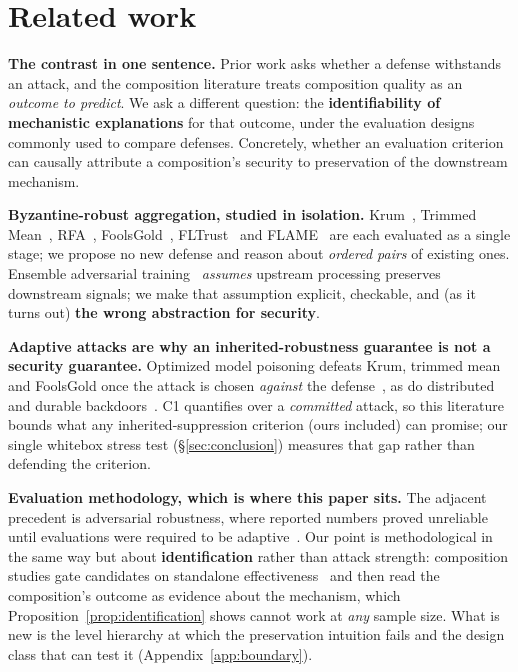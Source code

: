 \documentclass{article}
\begin{document}
\section{Related work}
\label{app:related}

\noindent\textbf{The contrast in one sentence.} Prior work asks whether a defense withstands an attack, and the composition literature treats composition quality as an \emph{outcome to predict}. We ask a different question: the \textbf{identifiability of mechanistic explanations} for that outcome, under the evaluation designs commonly used to compare defenses. Concretely, whether an evaluation criterion can causally attribute a composition's security to preservation of the downstream mechanism.

\noindent\textbf{Byzantine-robust aggregation, studied in isolation.} Krum~\citep{blanchard2017machine}, Trimmed Mean~\citep{yin2018byzantine}, RFA~\citep{pillutla2022robust}, FoolsGold~\citep{fung2020foolsgold}, FLTrust~\citep{cao2021fltrust} and FLAME~\citep{nguyen2022flame} are each evaluated as a single stage; we propose no new defense and reason about \emph{ordered pairs} of existing ones. Ensemble adversarial training~\citep{tramer2018ensemble} \emph{assumes} upstream processing preserves downstream signals; we make that assumption explicit, checkable, and (as it turns out) \textbf{the wrong abstraction for security}.

\noindent\textbf{Adaptive attacks are why an inherited-robustness guarantee is not a security guarantee.} Optimized model poisoning defeats Krum, trimmed mean and FoolsGold once the attack is chosen \emph{against} the defense~\citep{shejwalkar2021manipulating,bhagoji2019analyzing}, as do distributed and durable backdoors~\citep{xie2019dba,wang2020attack,zhang2022neurotoxin}. C1 quantifies over a \emph{committed} attack, so this literature bounds what any inherited-suppression criterion (ours included) can promise; our single whitebox stress test (\S\ref{sec:conclusion}) measures that gap rather than defending the criterion.

\noindent\textbf{Evaluation methodology, which is where this paper sits.} The adjacent precedent is adversarial robustness, where reported numbers proved unreliable until evaluations were required to be adaptive~\citep{croce2020robustbench}. Our point is methodological in the same way but about \textbf{identification} rather than attack strength: composition studies gate candidates on standalone effectiveness~\citep{kairouz2021advances} and then read the composition's outcome as evidence about the mechanism, which Proposition~\ref{prop:identification} shows cannot work at \emph{any} sample size. What is new is the level hierarchy at which the preservation intuition fails and the design class that can test it (Appendix~\ref{app:boundary}).
\end{document}
